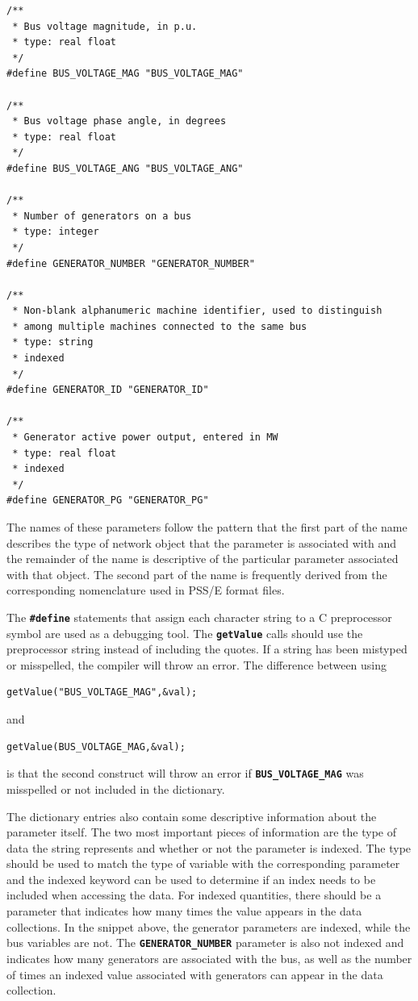 \documentclass[12pt]{report} %
\begin{document}
{
\color{red}
\begin{Verbatim}[fontseries=b]
/**
 * Bus voltage magnitude, in p.u.
 * type: real float
 */
#define BUS_VOLTAGE_MAG "BUS_VOLTAGE_MAG"

/**
 * Bus voltage phase angle, in degrees
 * type: real float
 */
#define BUS_VOLTAGE_ANG "BUS_VOLTAGE_ANG"

/**
 * Number of generators on a bus
 * type: integer
 */
#define GENERATOR_NUMBER "GENERATOR_NUMBER"

/**
 * Non-blank alphanumeric machine identifier, used to distinguish
 * among multiple machines connected to the same bus  
 * type: string
 * indexed
 */
#define GENERATOR_ID "GENERATOR_ID"

/**
 * Generator active power output, entered in MW 
 * type: real float
 * indexed
 */
#define GENERATOR_PG "GENERATOR_PG"
\end{Verbatim}
}

The names of these parameters follow the pattern that the first part of the name describes the type of network object that the parameter is associated with and the remainder of the name is descriptive of the particular parameter associated with that object. The second part of the name is frequently derived from the corresponding nomenclature used in PSS/E format files.

The \texttt{\textbf{\#define}} statements that assign each character string to a C preprocessor symbol are used as a debugging tool. The \texttt{\textbf{getValue}} calls should use the preprocessor string instead of including the quotes. If a string has been mistyped or misspelled, the compiler will throw an error. The difference between using

{
\color{red}
\begin{Verbatim}[fontseries=b]
getValue("BUS_VOLTAGE_MAG",&val);
\end{Verbatim}
}

and

{
\color{red}
\begin{Verbatim}[fontseries=b]
getValue(BUS_VOLTAGE_MAG,&val);
\end{Verbatim}
}

is that the second construct will throw an error if \texttt{\textbf{BUS\_VOLTAGE\_MAG}} was misspelled or not included in the dictionary.

The dictionary entries also contain some descriptive information about the parameter itself. The two most important pieces of information are the type of data the string represents and whether or not the parameter is indexed. The type should be used to match the type of variable with the corresponding parameter and the indexed keyword can be used to determine if an index needs to be included when accessing the data. For indexed quantities, there should be a parameter that indicates how many times the value appears in the data collections. In the snippet above, the generator parameters are indexed, while the bus variables are not. The \texttt{\textbf{GENERATOR\_NUMBER}} parameter is also not indexed and indicates how many generators are associated with the bus, as well as the number of times an indexed value associated with generators can appear in the data collection.
\end{document}
